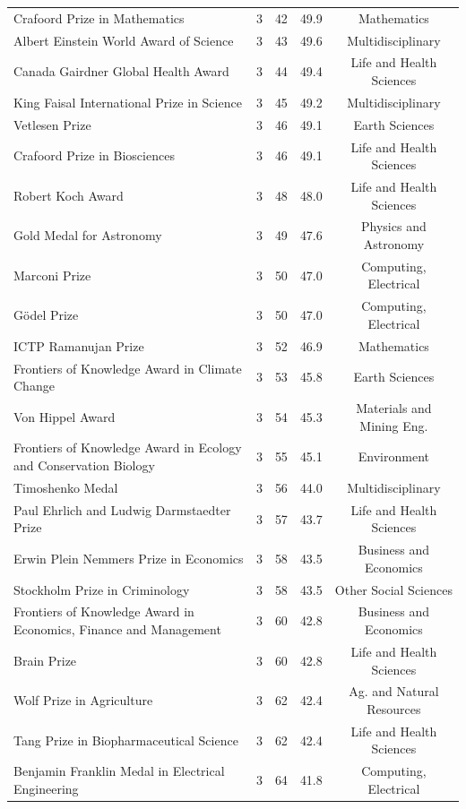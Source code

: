 \begin{longtable}{>{\raggedright\arraybackslash}p{7.2cm}cccc}
Crafoord Prize in Mathematics & 3 & 42 & 49.9 & Mathematics \\ 
Albert Einstein World Award of Science & 3 & 43 & 49.6 & Multidisciplinary \\ 
Canada Gairdner Global Health Award & 3 & 44 & 49.4 & Life and Health Sciences \\ 
King Faisal International Prize in Science & 3 & 45 & 49.2 & Multidisciplinary \\ 
Vetlesen Prize & 3 & 46 & 49.1 & Earth Sciences \\ 
Crafoord Prize in Biosciences & 3 & 46 & 49.1 & Life and Health Sciences \\ 
Robert Koch Award & 3 & 48 & 48.0 & Life and Health Sciences \\ 
Gold Medal for Astronomy & 3 & 49 & 47.6 & Physics and Astronomy \\ 
Marconi Prize & 3 & 50 & 47.0 & Computing, Electrical \\ 
Gödel Prize & 3 & 50 & 47.0 & Computing, Electrical \\ 
ICTP Ramanujan Prize & 3 & 52 & 46.9 & Mathematics \\ 
Frontiers of Knowledge Award in Climate Change & 3 & 53 & 45.8 & Earth Sciences \\ 
Von Hippel Award & 3 & 54 & 45.3 & Materials and Mining Eng. \\ 
Frontiers of Knowledge Award in Ecology and Conservation Biology & 3 & 55 & 45.1 & Environment \\ 
Timoshenko Medal & 3 & 56 & 44.0 & Multidisciplinary \\ 
Paul Ehrlich and Ludwig Darmstaedter Prize & 3 & 57 & 43.7 & Life and Health Sciences \\ 
Erwin Plein Nemmers Prize in Economics & 3 & 58 & 43.5 & Business and Economics \\ 
Stockholm Prize in Criminology & 3 & 58 & 43.5 & Other Social Sciences \\ 
Frontiers of Knowledge Award in Economics, Finance and Management & 3 & 60 & 42.8 & Business and Economics \\ 
Brain Prize & 3 & 60 & 42.8 & Life and Health Sciences \\ 
Wolf Prize in Agriculture & 3 & 62 & 42.4 & Ag. and Natural Resources \\ 
Tang Prize in Biopharmaceutical Science & 3 & 62 & 42.4 & Life and Health Sciences \\ 
Benjamin Franklin Medal in Electrical Engineering & 3 & 64 & 41.8 & Computing, Electrical \\ 

\end{longtable}
